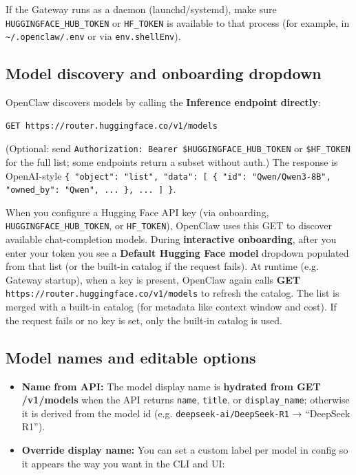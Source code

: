 If the Gateway runs as a daemon (launchd/systemd), make sure \texttt{HUGGINGFACE\_HUB\_TOKEN} or \texttt{HF\_TOKEN}
is available to that process (for example, in \texttt{\textasciitilde{}/.openclaw/.env} or via
\texttt{env.shellEnv}).

\subsection{Model discovery and onboarding dropdown}


OpenClaw discovers models by calling the \textbf{Inference endpoint directly}:

\begin{lstlisting}[language=bash]
GET https://router.huggingface.co/v1/models
\end{lstlisting}


(Optional: send \texttt{Authorization: Bearer \$HUGGINGFACE\_HUB\_TOKEN} or \texttt{\$HF\_TOKEN} for the full list; some endpoints return a subset without auth.) The response is OpenAI-style \texttt{\{ "object": "list", "data": [ \{ "id": "Qwen/Qwen3-8B", "owned\_by": "Qwen", ... \}, ... ] \}}.

When you configure a Hugging Face API key (via onboarding, \texttt{HUGGINGFACE\_HUB\_TOKEN}, or \texttt{HF\_TOKEN}), OpenClaw uses this GET to discover available chat-completion models. During \textbf{interactive onboarding}, after you enter your token you see a \textbf{Default Hugging Face model} dropdown populated from that list (or the built-in catalog if the request fails). At runtime (e.g. Gateway startup), when a key is present, OpenClaw again calls \textbf{GET} \texttt{https://router.huggingface.co/v1/models} to refresh the catalog. The list is merged with a built-in catalog (for metadata like context window and cost). If the request fails or no key is set, only the built-in catalog is used.

\subsection{Model names and editable options}


\begin{itemize}
  \item \textbf{Name from API:} The model display name is \textbf{hydrated from GET /v1/models} when the API returns \texttt{name}, \texttt{title}, or \texttt{display\_name}; otherwise it is derived from the model id (e.g. \texttt{deepseek-ai/DeepSeek-R1} → “DeepSeek R1”).
  \item \textbf{Override display name:} You can set a custom label per model in config so it appears the way you want in the CLI and UI:
\end{itemize}


